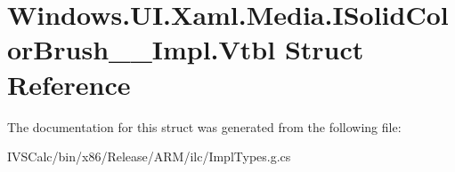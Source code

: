\hypertarget{struct_windows_1_1_u_i_1_1_xaml_1_1_media_1_1_i_solid_color_brush_____impl_1_1_vtbl}{}\section{Windows.\+U\+I.\+Xaml.\+Media.\+I\+Solid\+Color\+Brush\+\_\+\+\_\+\+Impl.\+Vtbl Struct Reference}
\label{struct_windows_1_1_u_i_1_1_xaml_1_1_media_1_1_i_solid_color_brush_____impl_1_1_vtbl}


The documentation for this struct was generated from the following file\+:\begin{DoxyCompactItemize}
\item 
I\+V\+S\+Calc/bin/x86/\+Release/\+A\+R\+M/ilc/Impl\+Types.\+g.\+cs\end{DoxyCompactItemize}
